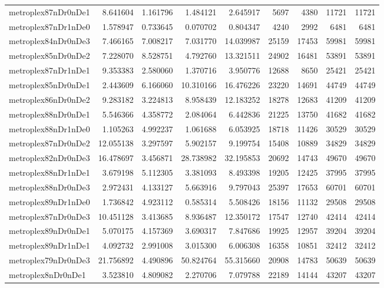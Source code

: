 \begin{longtable}{|l|r|r|r|r|r|r|r|r|}
metroplex87nDr0nDe1 & 8.641604 & 1.161796 & 1.484121 & 2.645917 & 5697 & 4380 & 11721 & 11721 \\
metroplex87nDr1nDe0 & 1.578947 & 0.733645 & 0.070702 & 0.804347 & 4240 & 2992 & 6481 & 6481 \\
metroplex84nDr0nDe3 & 7.466165 & 7.008217 & 7.031770 & 14.039987 & 25159 & 17453 & 59981 & 59981 \\
metroplex85nDr0nDe2 & 7.228070 & 8.528751 & 4.792760 & 13.321511 & 24902 & 16481 & 53891 & 53891 \\
metroplex87nDr1nDe1 & 9.353383 & 2.580060 & 1.370716 & 3.950776 & 12688 & 8650 & 25421 & 25421 \\
metroplex85nDr0nDe1 & 2.443609 & 6.166060 & 10.310166 & 16.476226 & 23220 & 14691 & 44749 & 44749 \\
metroplex86nDr0nDe2 & 9.283182 & 3.224813 & 8.958439 & 12.183252 & 18278 & 12683 & 41209 & 41209 \\
metroplex88nDr0nDe1 & 5.546366 & 4.358772 & 2.084064 & 6.442836 & 21225 & 13750 & 41682 & 41682 \\
metroplex88nDr1nDe0 & 1.105263 & 4.992237 & 1.061688 & 6.053925 & 18718 & 11426 & 30529 & 30529 \\
metroplex87nDr0nDe2 & 12.055138 & 3.297597 & 5.902157 & 9.199754 & 15408 & 10889 & 34829 & 34829 \\
metroplex82nDr0nDe3 & 16.478697 & 3.456871 & 28.738982 & 32.195853 & 20692 & 14743 & 49670 & 49670 \\
metroplex88nDr1nDe1 & 3.679198 & 5.112305 & 3.381093 & 8.493398 & 19205 & 12425 & 37995 & 37995 \\
metroplex88nDr0nDe3 & 2.972431 & 4.133127 & 5.663916 & 9.797043 & 25397 & 17653 & 60701 & 60701 \\
metroplex89nDr1nDe0 & 1.736842 & 4.923112 & 0.585314 & 5.508426 & 18156 & 11132 & 29508 & 29508 \\
metroplex87nDr0nDe3 & 10.451128 & 3.413685 & 8.936487 & 12.350172 & 17547 & 12740 & 42414 & 42414 \\
metroplex89nDr0nDe1 & 5.070175 & 4.157369 & 3.690317 & 7.847686 & 19925 & 12957 & 39204 & 39204 \\
metroplex89nDr1nDe1 & 4.092732 & 2.991008 & 3.015300 & 6.006308 & 16358 & 10851 & 32412 & 32412 \\
metroplex79nDr0nDe3 & 21.756892 & 4.490896 & 50.824764 & 55.315660 & 20908 & 14783 & 50639 & 50639 \\
metroplex8nDr0nDe1 & 3.523810 & 4.809082 & 2.270706 & 7.079788 & 22189 & 14144 & 43207 & 43207 \\

\end{longtable}
